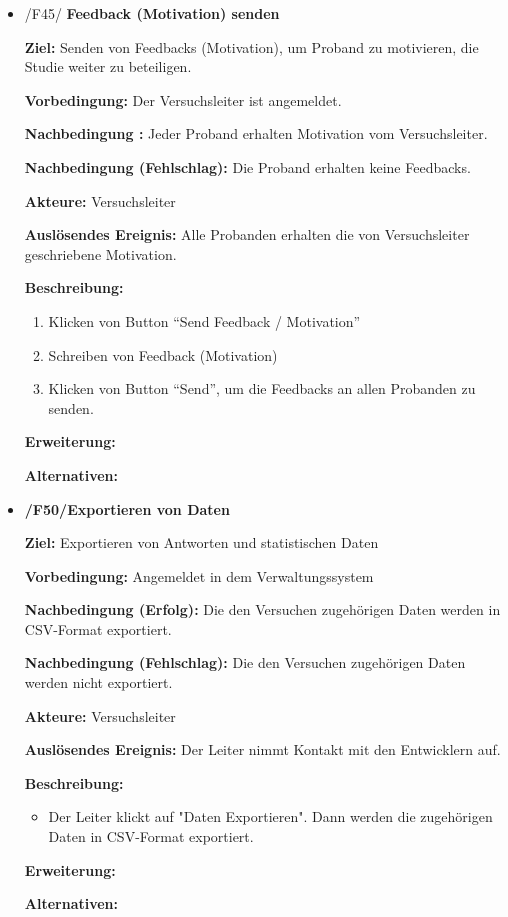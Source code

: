 \documentclass[a4paper]{scrreprt}
\begin{document}
\begin{itemize}
	
	            \item /F45/ \textbf{Feedback (Motivation) senden}
	            \par \textbf{Ziel: }Senden von Feedbacks (Motivation), um Proband zu motivieren, die Studie weiter zu beteiligen.
	            \par \textbf{Vorbedingung: }Der Versuchsleiter ist angemeldet.
	            \par \textbf{Nachbedingung : }Jeder Proband erhalten Motivation vom Versuchsleiter.
	            \par \textbf{Nachbedingung (Fehlschlag): }Die Proband erhalten keine Feedbacks.
	            \par \textbf{Akteure: }Versuchsleiter
	            \par \textbf{Auslösendes Ereignis: }Alle Probanden erhalten die von Versuchsleiter geschriebene Motivation.
	            \par \textbf{Beschreibung: }
	            \begin{enumerate}
	            	\item Klicken von Button ``Send Feedback / Motivation''
	            	\item Schreiben von Feedback (Motivation)
	            	\item Klicken von Button ``Send'', um die Feedbacks an allen Probanden zu senden.
	            \end{enumerate}
	            \par \textbf{Erweiterung: }
	            \par \textbf{Alternativen: }
	            	
	            \item \textbf{/F50/Exportieren von Daten}
	
	            \par \textbf{Ziel: }Exportieren von Antworten und statistischen Daten
	            \par \textbf{Vorbedingung: }Angemeldet in dem Verwaltungssystem
	            \par \textbf{Nachbedingung (Erfolg): }Die den Versuchen zugehörigen Daten werden in CSV-Format exportiert.
	            \par \textbf{Nachbedingung (Fehlschlag): }Die den Versuchen zugehörigen Daten werden nicht exportiert.
	            \par \textbf{Akteure: }Versuchsleiter
	            \par \textbf{Auslösendes Ereignis: }Der Leiter nimmt Kontakt mit den Entwicklern auf.
	            \par \textbf{Beschreibung: }
	            \begin{itemize}
	            	\item Der Leiter klickt auf "Daten Exportieren". Dann werden die zugehörigen Daten in CSV-Format exportiert.
	            \end{itemize}
	            \par \textbf{Erweiterung: }
	            \par \textbf{Alternativen: }
			\end{itemize}
\end{document}
